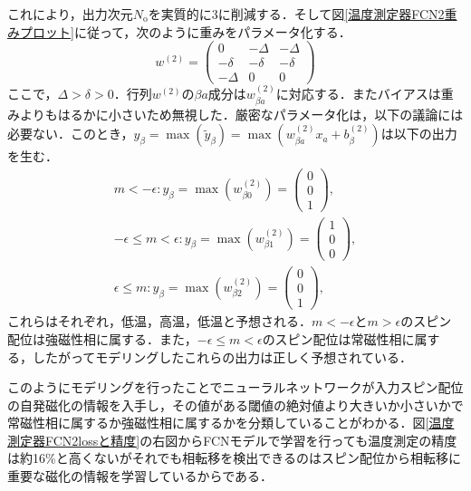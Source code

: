 \documentclass[a4paper,11pt]{jsreport}
\begin{document}
これにより，出力次元$N_{\text{o}}$を実質的に3に削減する．そして図\ref{温度測定器FCN2重みプロット}に従って，次のように重みをパラメータ化する．
\begin{equation}
  w^{(2)} =
  \begin{pmatrix}
    0       & -\Delta & -\Delta \\
    -\delta & -\delta & -\delta \\
    -\Delta & 0       & 0
  \end{pmatrix}
\end{equation}
ここで，$\Delta > \delta > 0$．行列$w^{(2)}$の$\beta a$成分は$w_{\beta a}^{(2)}$に対応する．またバイアスは重みよりもはるかに小さいため無視した．厳密なパラメータ化は，以下の議論には必要ない．このとき，$y_{\beta} = \max{(\tilde{y}_{\beta})}=\max{(w_{\beta a}^{(2)}x_a+b_{\beta}^{(2)})}$は以下の出力を生む．
\begin{align}
  m<-\epsilon : y_{\beta} = \max(w_{\beta 0}^{(2)}) =
  \begin{pmatrix}
    0 \\ 0 \\ 1
  \end{pmatrix}, \\
  -\epsilon \leq m < \epsilon : y_{\beta} = \max(w_{\beta 1}^{(2)}) =
  \begin{pmatrix}
    1 \\ 0 \\ 0
  \end{pmatrix}, \\
  \epsilon \leq m : y_{\beta} = \max(w_{\beta 2}^{(2)}) =
  \begin{pmatrix}
    0 \\ 0 \\ 1
  \end{pmatrix},
\end{align}
これらはそれぞれ，低温，高温，低温と予想される．$m<-\epsilon$と$m>\epsilon$のスピン配位は強磁性相に属する．また，$-\epsilon \leq m < \epsilon$のスピン配位は常磁性相に属する，したがってモデリングしたこれらの出力は正しく予想されている．\par
このようにモデリングを行ったことでニューラルネットワークが入力スピン配位の自発磁化の情報を入手し，その値がある閾値の絶対値より大きいか小さいかで常磁性相に属するか強磁性相に属するかを分類していることがわかる．図\ref{温度測定器FCN2lossと精度}の右図からFCNモデルで学習を行っても温度測定の精度は約16\%と高くないがそれでも相転移を検出できるのはスピン配位から相転移に重要な磁化の情報を学習しているからである．
\end{document}
